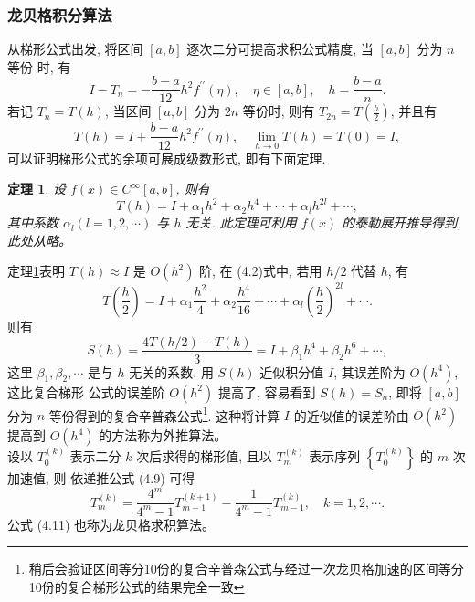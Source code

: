 \documentclass{ctexart}%
\newtheorem{theorem}{定理}%
\begin{document}
\subsubsection{龙贝格积分算法}
从梯形公式出发, 将区间 $[a, b]$ 逐次二分可提高求积公式精度, 当 $[a, b]$ 分为 $n$ 等份 时, 有
$$
I-T_{n}=-\frac{b-a}{12} h^{2} f^{\prime \prime}(\eta), \quad \eta \in[a, b], \quad h=\frac{b-a}{n} .
$$
若记 $T_{n}=T(h)$, 当区间 $[a, b]$ 分为 $2 n$ 等份时, 则有 $T_{2 n}=T\left(\frac{h}{2}\right)$, 并且有
$$
T(h)=I+\frac{b-a}{12} h^{2} f^{\prime \prime}(\eta), \quad \lim _{h \rightarrow 0} T(h)=T(0)=I,
$$
可以证明梯形公式的余项可展成级数形式, 即有下面定理.\\
\begin{theorem}
设 $f(x) \in C^{\infty}[a, b]$, 则有
$$
T(h)=I+\alpha_{1} h^{2}+\alpha_{2} h^{4}+\cdots+\alpha_{l} h^{2 l}+\cdots,
$$
其中系数 $\alpha_{l}(l=1,2, \cdots)$ 与 $h$ 无关.
此定理可利用 $f(x)$ 的泰勒展开推导得到, 此处从略。
\label{theorem1}
\end{theorem} 
 定理\ref{theorem1}表明 $T(h) \approx I$ 是 $O\left(h^{2}\right)$ 阶, 在 (4.2)式中, 若用 $h / 2$ 代替 $h$, 有
$$
T\left(\frac{h}{2}\right)=I+\alpha_{1} \frac{h^{2}}{4}+\alpha_{2} \frac{h^{4}}{16}+\cdots+\alpha_{l}\left(\frac{h}{2}\right)^{2 l}+\cdots .
$$
 则有
$$
S(h)=\frac{4 T(h / 2)-T(h)}{3}=I+\beta_{1} h^{4}+\beta_{2} h^{6}+\cdots,
$$
这里 $\beta_{1}, \beta_{2}, \cdots$ 是与 $h$ 无关的系数. 用 $S(h)$ 近似积分值 $I$, 其误差阶为 $O\left(h^{4}\right)$, 这比复合梯形 公式的误差阶 $O\left(h^{2}\right)$ 提高了, 容易看到 $S(h)=S_{n}$, 即将 $[a, b]$ 分为 $n$ 等份得到的复合辛普森公式\footnote{稍后会验证区间等分10份的复合辛普森公式与经过一次龙贝格加速的区间等分10份的复合梯形公式的结果完全一致}. 这种将计算 $I$ 的近似值的误差阶由 $O\left(h^{2}\right)$ 提高到 $O\left(h^{4}\right)$ 的方法称为外推算法。
\\设以 $T_{0}^{(k)}$ 表示二分 $k$ 次后求得的梯形值, 且以 $T_{m}^{(k)}$ 表示序列 $\left\{T_{0}^{(k)}\right\}$ 的 $m$ 次加速值, 则 依递推公式 (4.9) 可得
$$
T_{m}^{(k)}=\frac{4^{m}}{4^{m}-1} T_{m-1}^{(k+1)}-\frac{1}{4^{m}-1} T_{m-1}^{(k)}, \quad k=1,2, \cdots .
$$
公式 (4.11) 也称为龙贝格求积算法。
\end{document}
